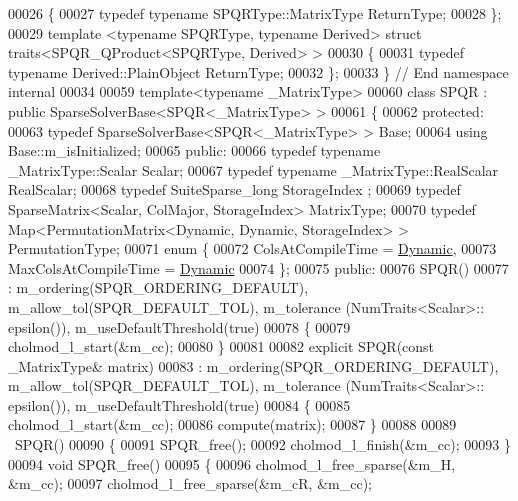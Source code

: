 \begin{DoxyCode}
00026     \{
00027       \textcolor{keyword}{typedef} \textcolor{keyword}{typename} SPQRType::MatrixType ReturnType;
00028     \};
00029     \textcolor{keyword}{template} <\textcolor{keyword}{typename} SPQRType, \textcolor{keyword}{typename} Derived> \textcolor{keyword}{struct }traits<SPQR\_QProduct<SPQRType, Derived> >
00030     \{
00031       \textcolor{keyword}{typedef} \textcolor{keyword}{typename} Derived::PlainObject ReturnType;
00032     \};
00033   \} \textcolor{comment}{// End namespace internal}
00034   
00059 \textcolor{keyword}{template}<\textcolor{keyword}{typename} \_MatrixType>
00060 \textcolor{keyword}{class }SPQR : \textcolor{keyword}{public} SparseSolverBase<SPQR<\_MatrixType> >
00061 \{
00062   \textcolor{keyword}{protected}:
00063     \textcolor{keyword}{typedef} SparseSolverBase<SPQR<\_MatrixType> > Base;
00064     \textcolor{keyword}{using} Base::m\_isInitialized;
00065   \textcolor{keyword}{public}:
00066     \textcolor{keyword}{typedef} \textcolor{keyword}{typename} \_MatrixType::Scalar Scalar;
00067     \textcolor{keyword}{typedef} \textcolor{keyword}{typename} \_MatrixType::RealScalar RealScalar;
00068     \textcolor{keyword}{typedef} SuiteSparse\_long StorageIndex ;
00069     \textcolor{keyword}{typedef} SparseMatrix<Scalar, ColMajor, StorageIndex> MatrixType;
00070     \textcolor{keyword}{typedef} Map<PermutationMatrix<Dynamic, Dynamic, StorageIndex> > PermutationType;
00071     \textcolor{keyword}{enum} \{
00072       ColsAtCompileTime = \hyperlink{namespace_eigen_ad81fa7195215a0ce30017dfac309f0b2}{Dynamic},
00073       MaxColsAtCompileTime = \hyperlink{namespace_eigen_ad81fa7195215a0ce30017dfac309f0b2}{Dynamic}
00074     \};
00075   \textcolor{keyword}{public}:
00076     SPQR() 
00077       : m\_ordering(SPQR\_ORDERING\_DEFAULT), m\_allow\_tol(SPQR\_DEFAULT\_TOL), m\_tolerance (NumTraits<Scalar>::
      epsilon()), m\_useDefaultThreshold(true)
00078     \{ 
00079       cholmod\_l\_start(&m\_cc);
00080     \}
00081     
00082     \textcolor{keyword}{explicit} SPQR(\textcolor{keyword}{const} \_MatrixType& matrix)
00083     : m\_ordering(SPQR\_ORDERING\_DEFAULT), m\_allow\_tol(SPQR\_DEFAULT\_TOL), m\_tolerance (NumTraits<Scalar>::
      epsilon()), m\_useDefaultThreshold(true)
00084     \{
00085       cholmod\_l\_start(&m\_cc);
00086       compute(matrix);
00087     \}
00088     
00089     ~SPQR()
00090     \{
00091       SPQR\_free();
00092       cholmod\_l\_finish(&m\_cc);
00093     \}
00094     \textcolor{keywordtype}{void} SPQR\_free()
00095     \{
00096       cholmod\_l\_free\_sparse(&m\_H, &m\_cc);
00097       cholmod\_l\_free\_sparse(&m\_cR, &m\_cc);

\end{DoxyCode}
